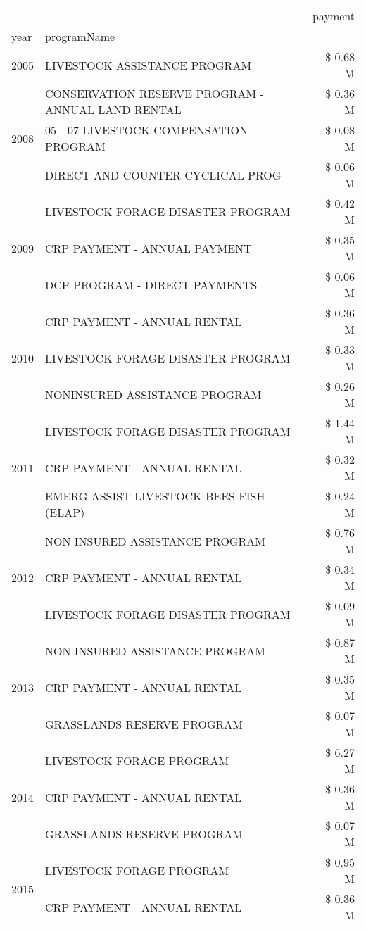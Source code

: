 \begin{tabular}{llr}
\toprule
 &  & payment \\
year & programName &  \\
\midrule
2005 & LIVESTOCK ASSISTANCE PROGRAM & \$ 0.68 M \\
\cline{1-3}
\multirow[t]{3}{*}{2008} & CONSERVATION RESERVE PROGRAM - ANNUAL LAND RENTAL & \$ 0.36 M \\
 & 05 - 07 LIVESTOCK COMPENSATION PROGRAM & \$ 0.08 M \\
 & DIRECT AND COUNTER CYCLICAL PROG & \$ 0.06 M \\
\cline{1-3}
\multirow[t]{3}{*}{2009} & LIVESTOCK FORAGE DISASTER  PROGRAM & \$ 0.42 M \\
 & CRP PAYMENT - ANNUAL PAYMENT & \$ 0.35 M \\
 & DCP PROGRAM - DIRECT PAYMENTS & \$ 0.06 M \\
\cline{1-3}
\multirow[t]{3}{*}{2010} & CRP PAYMENT - ANNUAL RENTAL & \$ 0.36 M \\
 & LIVESTOCK FORAGE DISASTER PROGRAM & \$ 0.33 M \\
 & NONINSURED ASSISTANCE PROGRAM & \$ 0.26 M \\
\cline{1-3}
\multirow[t]{3}{*}{2011} & LIVESTOCK FORAGE DISASTER PROGRAM & \$ 1.44 M \\
 & CRP PAYMENT - ANNUAL RENTAL & \$ 0.32 M \\
 & EMERG ASSIST LIVESTOCK BEES FISH (ELAP) & \$ 0.24 M \\
\cline{1-3}
\multirow[t]{3}{*}{2012} & NON-INSURED ASSISTANCE PROGRAM & \$ 0.76 M \\
 & CRP PAYMENT - ANNUAL RENTAL & \$ 0.34 M \\
 & LIVESTOCK FORAGE DISASTER PROGRAM & \$ 0.09 M \\
\cline{1-3}
\multirow[t]{3}{*}{2013} & NON-INSURED ASSISTANCE PROGRAM & \$ 0.87 M \\
 & CRP PAYMENT - ANNUAL RENTAL & \$ 0.35 M \\
 & GRASSLANDS RESERVE PROGRAM & \$ 0.07 M \\
\cline{1-3}
\multirow[t]{3}{*}{2014} & LIVESTOCK FORAGE PROGRAM & \$ 6.27 M \\
 & CRP PAYMENT - ANNUAL RENTAL & \$ 0.36 M \\
 & GRASSLANDS RESERVE PROGRAM & \$ 0.07 M \\
\cline{1-3}
\multirow[t]{3}{*}{2015} & LIVESTOCK FORAGE PROGRAM & \$ 0.95 M \\
 & CRP PAYMENT - ANNUAL RENTAL & \$ 0.36 M \\

\end{tabular}
